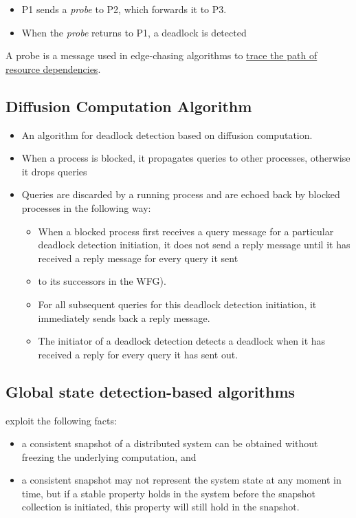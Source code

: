 \begin{itemize}
	\item P1 sends a \textit{probe} to P2, which forwards it to P3.
	\item When the \textit{probe} returns to P1, a deadlock is detected
\end{itemize}

A probe is a message used in edge-chasing algorithms to \ul{trace the path of resource dependencies}.

\subsection{Diffusion Computation Algorithm}
\begin{itemize}
	\item An algorithm for deadlock detection based on diffusion computation.
	\item When a process is blocked, it propagates queries to other processes, otherwise it drops queries
	\item Queries are discarded by a running process and are echoed back by blocked processes in the following way:
   \begin{itemize}
   	\item When a blocked process first receives a query message for a particular deadlock detection initiation, it does not send a reply message until it has received a reply message for every query it sent
   	\item to its successors in the WFG).
   	\item For all subsequent queries for this deadlock detection initiation, it immediately sends back a reply message.
   	\item The initiator of a deadlock detection detects a deadlock when it has received a reply for every query it has sent out.
   \end{itemize}
\end{itemize}

\subsection{Global state detection-based algorithms}

exploit the following facts:
\begin{itemize}
	\item a consistent snapshot of a distributed system can be
   obtained without freezing the underlying computation,
   and
	\item a consistent snapshot may not represent the system
   state at any moment in time, but if a stable property
   holds in the system before the snapshot collection is
   initiated, this property will still hold in the snapshot.
\end{itemize}

